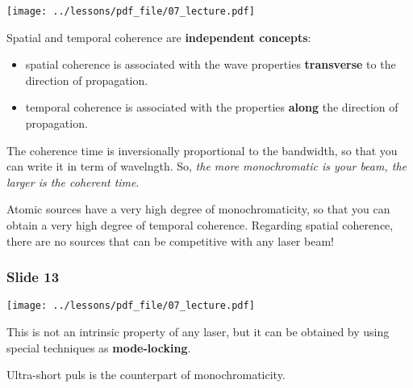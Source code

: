\documentclass[../main/main.tex]{subfiles}
\begin{document}
\begin{minipage}[]{0.5\linewidth}
\centering
\texttt{[image: ../lessons/pdf\_file/07\_lecture.pdf]}
\end{minipage}
\hspace{0.3cm}\vspace{0.3cm}
\begin{minipage}[c]{0.47\linewidth}

Spatial and temporal coherence are \textbf{independent concepts}:

\begin{itemize}
\item spatial coherence is associated with the wave properties \textbf{transverse} to the direction of propagation.

\item temporal coherence is associated with the properties \textbf{along} the direction of propagation.

\end{itemize}

The coherence time is inversionally proportional to the bandwidth, so that you can write it in term of wavelngth. So, \emph{the more monochromatic is your beam, the larger is the coherent time}.

Atomic sources have a very high degree of monochromaticity, so that you can obtain a very high degree of temporal coherence. Regarding spatial coherence, there are no sources that can be competitive with any laser beam!

\end{minipage}

\subsubsection*{Slide 13}

\begin{minipage}[]{0.5\linewidth}
\centering
\texttt{[image: ../lessons/pdf\_file/07\_lecture.pdf]}
\end{minipage}
\hspace{0.3cm}\vspace{0.3cm}
\begin{minipage}[c]{0.47\linewidth}

This is not an intrinsic property of any laser, but it can be obtained by using special techniques as \textbf{mode-locking}.

Ultra-short puls is the counterpart of monochromaticity.

\end{minipage}
\end{document}
